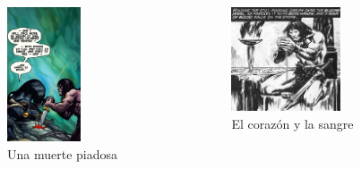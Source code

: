 \begin{frame}{}
\begin{columns}
    \begin{figure}[htb]
    \centering
        \includegraphics[width=0.55\textwidth]{img/res/17}
        \caption{Una muerte piadosa}
    \end{figure}    
    \begin{figure}[htb]
    \centering
        \includegraphics[width=0.7\textwidth]{img/res/18}
        \caption{El corazón y la sangre}
    \end{figure}    
\end{columns}
\end{frame}

